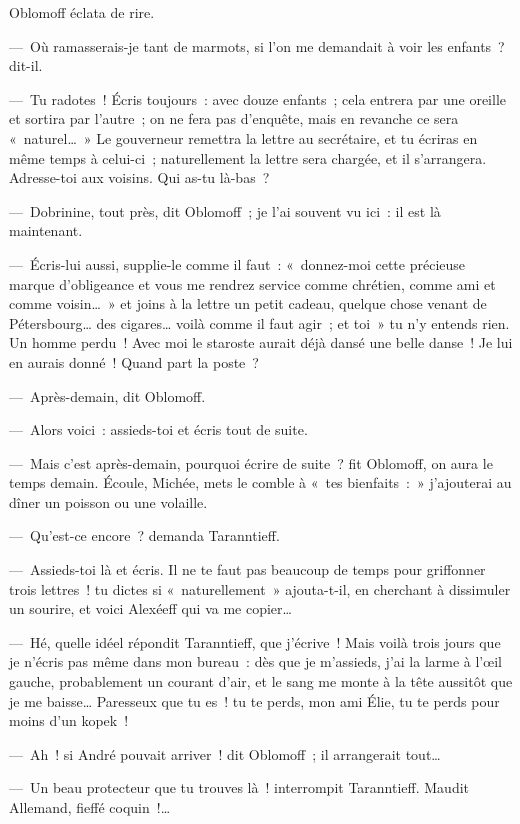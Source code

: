 \documentclass[french,twoside]{book} %
\begin{document}
Oblomoff éclata de rire.\par
— Où ramasserais-je tant de marmots, si l’on me demandait à voir les enfants ? dit-il.\par
— Tu radotes ! Écris toujours : avec douze enfants ; cela entrera par une oreille et sortira par l’autre ; on ne fera pas d’enquête, mais en revanche ce sera « naturel… » Le gouverneur remettra la lettre au secrétaire, et tu écriras en même temps à celui-ci ; naturellement la lettre sera chargée, et il s’arrangera. Adresse-toi aux voisins. Qui as-tu là-bas ?\par
— Dobrinine, tout près, dit Oblomoff ; je l’ai souvent vu ici : il est là maintenant.\par
— Écris-lui aussi, supplie-le comme il faut : « donnez-moi cette précieuse marque d’obligeance et vous me rendrez service comme chrétien, comme ami et comme voisin… » et joins à la lettre un petit cadeau, quelque chose venant de Pétersbourg… des cigares… voilà comme il faut agir ; et toi » tu n’y entends rien. Un homme perdu ! Avec moi le staroste aurait déjà dansé une belle danse ! Je lui en aurais donné ! Quand part la poste ?\par
— Après-demain, dit Oblomoff.\par
— Alors voici : assieds-toi et écris tout de suite.\par
— Mais c’est après-demain, pourquoi écrire de suite ? fit Oblomoff, on aura le temps demain. Écoule, Michée, mets le comble à « tes bienfaits : » j’ajouterai au dîner un poisson ou une volaille.\par
— Qu’est-ce encore ? demanda Taranntieff.\par
— Assieds-toi là et écris. Il ne te faut pas beaucoup de temps pour griffonner trois lettres ! tu dictes si « naturellement » ajouta-t-il, en cherchant à dissimuler un sourire, et voici Alexéeff qui va me copier…\par
— Hé, quelle idéel répondit Taranntieff, que j’écrive ! Mais voilà trois jours que je n’écris pas même dans mon bureau : dès que je m’assieds, j’ai la larme à l’œil gauche, probablement un courant d’air, et le sang me monte à la tête aussitôt que je me baisse… Paresseux que tu es ! tu te perds, mon ami Élie, tu te perds pour moins d’un kopek !\par
— Ah ! si André pouvait arriver ! dit Oblomoff ; il arrangerait tout…\par
— Un beau protecteur que tu trouves là ! interrompit Taranntieff. Maudit Allemand, fieffé coquin !…\par
\end{document}
